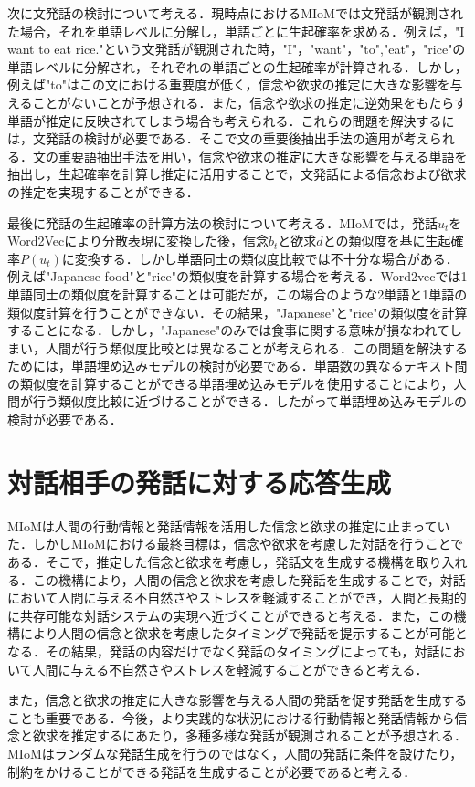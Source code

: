 \par
次に文発話の検討について考える．現時点におけるMIoMでは文発話が観測された場合，それを単語レベルに分解し，単語ごとに生起確率を求める．例えば，"I want to eat rice."という文発話が観測された時，"I"，"want"，"to","eat"，"rice"の単語レベルに分解され，それぞれの単語ごとの生起確率が計算される．しかし，例えば"to"はこの文における重要度が低く，信念や欲求の推定に大きな影響を与えることがないことが予想される．また，信念や欲求の推定に逆効果をもたらす単語が推定に反映されてしまう場合も考えられる．これらの問題を解決するには，文発話の検討が必要である．そこで文の重要後抽出手法の適用が考えられる．文の重要語抽出手法を用い，信念や欲求の推定に大きな影響を与える単語を抽出し，生起確率を計算し推定に活用することで，文発話による信念および欲求の推定を実現することができる．

\par
最後に発話の生起確率の計算方法の検討について考える．MIoMでは，発話$u_t$をWord2Vecにより分散表現に変換した後，信念$b_t$と欲求$d$との類似度を基に生起確率$P(u_t)$に変換する．しかし単語同士の類似度比較では不十分な場合がある．例えば"Japanese food"と"rice"の類似度を計算する場合を考える．Word2vecでは1単語同士の類似度を計算することは可能だが，この場合のような2単語と1単語の類似度計算を行うことができない．その結果，"Japanese"と"rice"の類似度を計算することになる．しかし，"Japanese"のみでは食事に関する意味が損なわれてしまい，人間が行う類似度比較とは異なることが考えられる．この問題を解決するためには，単語埋め込みモデルの検討が必要である．単語数の異なるテキスト間の類似度を計算することができる単語埋め込みモデルを使用することにより，人間が行う類似度比較に近づけることができる．したがって単語埋め込みモデルの検討が必要である．


\section{対話相手の発話に対する応答生成}

\par
MIoMは人間の行動情報と発話情報を活用した信念と欲求の推定に止まっていた．しかしMIoMにおける最終目標は，信念や欲求を考慮した対話を行うことである．そこで，推定した信念と欲求を考慮し，発話文を生成する機構を取り入れる．この機構により，人間の信念と欲求を考慮した発話を生成することで，対話において人間に与える不自然さやストレスを軽減することができ，人間と長期的に共存可能な対話システムの実現へ近づくことができると考える．また，この機構により人間の信念と欲求を考慮したタイミングで発話を提示することが可能となる．その結果，発話の内容だけでなく発話のタイミングによっても，対話において人間に与える不自然さやストレスを軽減することができると考える．

\par
また，信念と欲求の推定に大きな影響を与える人間の発話を促す発話を生成することも重要である．今後，より実践的な状況における行動情報と発話情報から信念と欲求を推定するにあたり，多種多様な発話が観測されることが予想される．MIoMはランダムな発話生成を行うのではなく，人間の発話に条件を設けたり，制約をかけることができる発話を生成することが必要であると考える．
